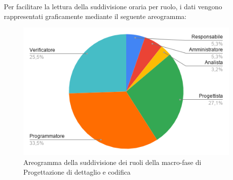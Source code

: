 \documentclass[../piano-di-progetto.tex]{subfiles}
\begin{document}
  Per facilitare la lettura della suddivisione oraria per ruolo, i dati vengono rappresentati graficamente mediante il seguente areogramma:
  \begin{figure}[H]
    \centering
    \includegraphics[width=12cm]{img/ruoli-codifica.png}
    \caption{Areogramma della suddivisione dei ruoli della macro-fase di Progettazione di dettaglio e codifica}
    \label{fig:ore-ruolo-codifica}
  \end{figure}
\end{document}
